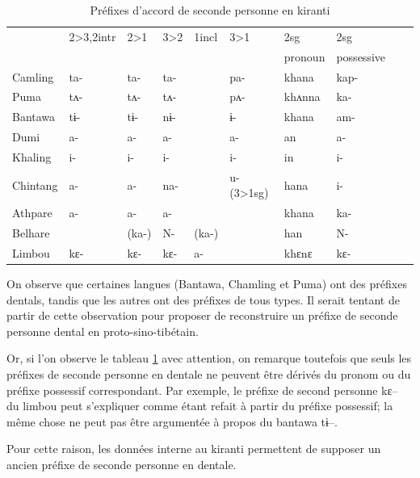 \documentclass[oldfontcommands,oneside,a4paper,11pt]{memoir}
\begin{document}
 
\begin{table}[H]
\caption{Préfixes d'accord de seconde personne en kiranti}\label{tab:prefixes.kiranti}
\begin{tabular}{llllllllll} 
\toprule
    &	2>3,2intr   &	2>1   &	3>2   &	1incl   &	3>1   &	2sg   &	2sg   \\
&	  &	   &  &	  &   &	pronoun   &	possessive  \\
\midrule
Camling   &	ta-   &	ta-   &	ta-   &	    &	pa-   &	khana   &	kap-   \\
Puma   &	tʌ-   &	tʌ-   &	tʌ-   &	    &	pʌ-   &	khʌnna   &	ka-   \\
Bantawa   &	tɨ-   &	tɨ-   &	nɨ-   &	    &	ɨ-   &	khana   &	am-   \\
\midrule
Dumi   &	a-   &	a-   &	a-   &	             &	a-   &	an   &	a-   \\
Khaling   &	i-   &	i-   &	i-   &	    &	i-   &	in   &	i-   \\
Chintang   &	a-   &	a-   &	na-   &	    &	u- (3>1sg)   &	hana   &	i-   \\
Athpare   &	a-   &	a-   &	a-   &	    &	    &	khana   &	ka-   \\
Belhare   &	    &	(ka-)  &	N-   &	(ka-)   &	   &	han   &	N-   \\
Limbou   &	kɛ-   &	kɛ-   &	kɛ-   &	a-   &	    &	khɛnɛ   &	kɛ-   \\
\bottomrule
\end{tabular}
\end{table}
On observe que certaines langues (Bantawa, Chamling et Puma) ont des préfixes dentals, tandis que les autres ont des préfixes de tous types. Il serait tentant de partir de cette observation pour proposer de reconstruire un préfixe de seconde personne dental en proto-sino-tibétain. 

Or, si l'on observe le tableau \ref{tab:prefixes.kiranti} avec attention, on remarque toutefois que seuls les préfixes de seconde personne en dentale ne peuvent  être dérivés du pronom ou du préfixe possessif correspondant. Par exemple, le préfixe de second personne kɛ-- du limbou peut s'expliquer comme étant refait à partir du préfixe possessif; la même chose ne peut pas être argumentée à propos du bantawa tɨ--.

Pour cette raison, les données interne au kiranti permettent de supposer un ancien préfixe de seconde personne en dentale.
\end{document}
